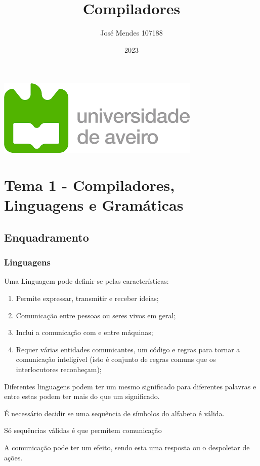 \documentclass{article}
\title{Compiladores}
\author{José Mendes 107188}
\date{2023}
\begin{document}
\begin{titlepage}
    \maketitle
    \begin{center}
        \includegraphics[scale=0.4]{UA.png}
    \end{center}
    \thispagestyle{empty} %
\end{titlepage}

\pagebreak

\section{Tema 1 - Compiladores, Linguagens e
Gramáticas}

\subsection{Enquadramento}

\subsubsection{Linguagens}

Uma Linguagem pode definir-se pelas características:
\begin{enumerate}
  \item Permite expressar, transmitir e receber ideias;
  \item Comunicação entre pessoas ou seres vivos em geral;
  \item Inclui a comunicação com e entre máquinas;
  \item Requer várias entidades comunicantes, um código e regras para tornar a
  comunicação inteligível (isto é conjunto de regras comuns que os interlocutores reconheçam);
\end{enumerate}

\begin{flushleft}
  \item Diferentes linguagens podem ter um mesmo significado para diferentes palavras e entre estas podem ter mais do que um significado.
  \item É necessário decidir se uma sequência de símbolos do alfabeto é válida.
  \item Só sequências válidas é que permitem comunicação
  \item A comunicação pode ter um efeito, sendo esta uma resposta ou o despoletar de ações.
\end{flushleft}
\end{document}
